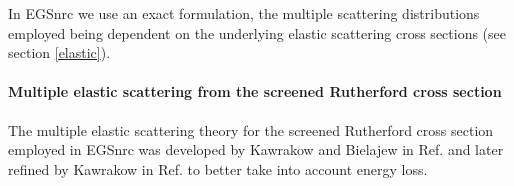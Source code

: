In EGSnrc we use an exact formulation, the multiple scattering
distributions employed being dependent on the underlying
elastic scattering cross sections (see section \ref{elastic}).

\paragraph{Multiple elastic scattering from the screened Rutherford
cross section} \hfill

The multiple elastic scattering theory for the screened
Rutherford cross section employed in EGSnrc was developed
by Kawrakow and Bielajew in Ref. \cite{KB97} and later refined
by Kawrakow in Ref. \cite{Ka99a} to better take into account
energy loss.

